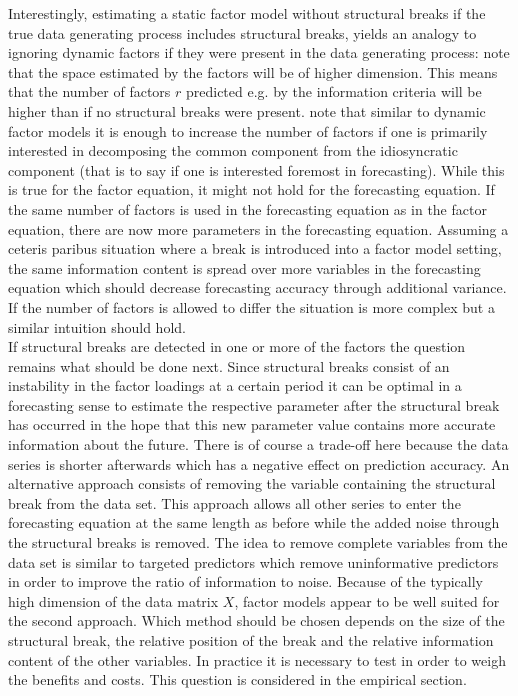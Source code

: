 \documentclass[12pt]{article}
\begin{document}
Interestingly, estimating a static factor model without structural breaks if the true data generating process includes structural breaks, yields an analogy to ignoring dynamic factors if they were present in the data generating process: \citet{breitung2011testing} note that the space estimated by the factors will be of higher dimension. This means that the number of factors $r$ predicted e.g. by the \citet{bai2002determining} information criteria will be higher than if no structural breaks were present. \citet{breitung2011testing} note that similar to dynamic factor models it is enough to increase the number of factors if one is primarily interested in decomposing the common component from the idiosyncratic component (that is to say if one is interested foremost in forecasting). While this is true for the factor equation, it might not hold for the forecasting equation. If the same number of factors is used in the forecasting equation as in the factor equation, there are now more parameters in the forecasting equation. Assuming a ceteris paribus situation where a break is introduced into a factor model setting, the same information content is spread over more variables in the forecasting equation which should decrease forecasting accuracy through additional variance. If the number of factors is allowed to differ the situation is more complex but a similar intuition should hold. \\


If structural breaks are detected in one or more of the factors the question remains what should be done next. Since structural breaks consist of an instability in the factor loadings at a certain period it can be optimal in a forecasting sense to estimate the respective parameter after the structural break has occurred in the hope that this new parameter value contains more accurate information about the future. There is of course a trade-off here because the data series is shorter afterwards which has a negative effect on prediction accuracy.
An alternative approach consists of removing the variable containing the structural break from the data set. This approach allows all other series to enter the forecasting equation at the same length as before while the added noise through the structural breaks is removed. The idea to remove complete variables from the data set is similar to targeted predictors which remove uninformative predictors in order to improve the ratio of information to noise. Because of the typically high dimension of the data matrix $X$, factor models appear to be well suited for the second approach. Which method should be chosen depends on the size of the structural break, the relative position of the break and the relative information content of the other variables. In practice it is necessary to test in order to weigh the benefits and costs. This question is considered in the empirical section.
\end{document}
